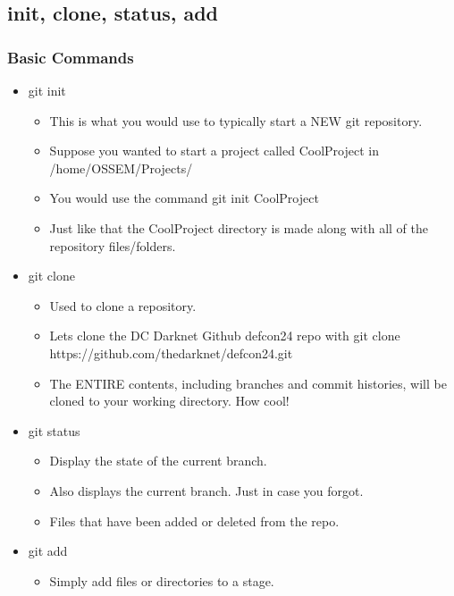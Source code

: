 \documentclass{beamer}
\begin{document}
\subsection{init, clone, status, add}
\begin{frame}
    \frametitle{Basic Commands}
    \begin{itemize}

        \item{git init}
        \begin{itemize}
            \item{This is what you would use to typically start a NEW git repository.}
            \item{Suppose you wanted to start a project called CoolProject in /home/OSSEM/Projects/}
            \item{You would use the command git init CoolProject}
            \item{Just like that the CoolProject directory is made along with all of the repository files/folders.}
        \end{itemize}

        \item{git clone}
        \begin{itemize}
            \item{Used to clone a repository.}
            \item{Lets clone the DC Darknet Github defcon24 repo with git clone https://github.com/thedarknet/defcon24.git}
            \item{The ENTIRE contents, including branches and commit histories, will be cloned to your working directory. How cool!}
        \end{itemize}
        
        \item{git status}
        \begin{itemize}
            \item{Display the state of the current branch.}
            \item{Also displays the current branch. Just in case you forgot.}
            \item{Files that have been added or deleted from the repo.}
        \end{itemize}

        \item{git add}
        \begin{itemize}
            \item{Simply add files or directories to a stage.}
        \end{itemize}

    \end{itemize}
\end{frame}
\end{document}
